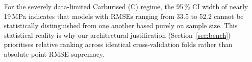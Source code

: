 \documentclass[12pt,a4paper]{article}
\begin{document}
For the severely data-limited Carburised (C) regime, the 95\,\% CI width of nearly 19\,MPa indicates that models with RMSEs ranging from 33.5 to 52.2 cannot be statistically distinguished from one another based purely on sample size. This statistical reality is why our architectural justification (Section~\ref{sec:bench}) prioritises relative ranking across identical cross-validation folds rather than absolute point-RMSE supremacy.
\end{document}
